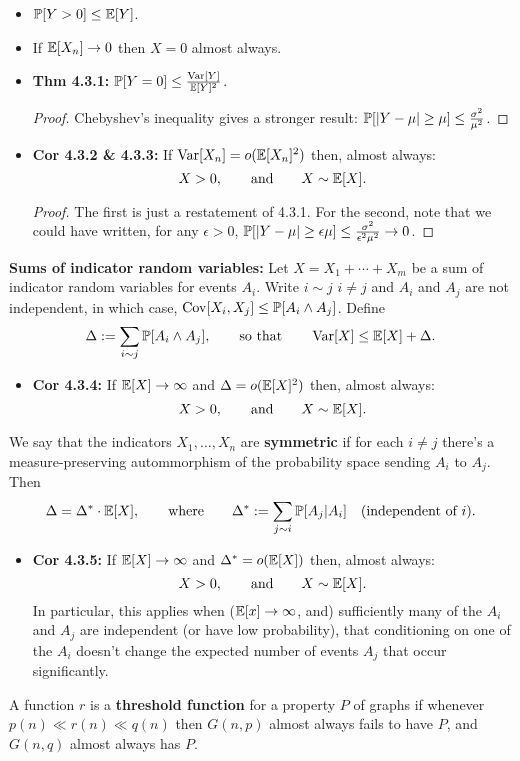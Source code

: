 \documentclass[11pt]{article}
\newenvironment{INT}[1][]{\begin{itemize}\small\item\textbf{#1}}{\end{itemize}}
\newcommand{\moreINT}[1][]{\item\textbf{#1}}
\begin{document}
\begin{chapter4}
\begin{itemise}
\begin{INT}
$\operatorname{\mathbb{P}}[Y>0]\leq\operatorname{\mathbb{E}}[Y]$.
\moreINT If $\operatorname{\mathbb{E}}[X_n]\rightarrow0$ then $X=0$ almost always.
\moreINT[Thm 4.3.1:] $\operatorname{\mathbb{P}}[Y=0]\leq\frac{\operatorname{Var}[Y]}{\operatorname{\mathbb{E}}[Y]^2}$.
\begin{proof}
Chebyshev's inequality gives a stronger result:
$\operatorname{\mathbb{P}}[|Y-\mu|\geq\mu]\leq\frac{\sigma^2}{\mu^2}$.
\end{proof}
\moreINT[Cor 4.3.2 \& 4.3.3:] If $\operatorname{Var}[X_n]=o(\operatorname{\mathbb{E}}[X_n]^2)$ then, almost always:
\[X>0,\textup{\qquad and\qquad}X\sim \operatorname{\mathbb{E}}[X].\]
\begin{proof}
The first is just a restatement of 4.3.1. For the second, note that we could have written, for any $\epsilon>0$, 
$\operatorname{\mathbb{P}}[|Y-\mu|\geq\epsilon\mu]\leq\frac{\sigma^2}{\epsilon^2\mu^2}\rightarrow0$.
\end{proof}
\end{INT}
\item \textbf{Sums of indicator random variables:} Let $X=X_1+\cdots+X_m$ be a sum of indicator random variables for events $A_i$. Write $i\sim j$ \Iff $i\neq j$ and $A_i$ and $A_j$ are not independent, in which case, $\operatorname{Cov}[X_i,X_j]\leq\operatorname{\mathbb{P}}[A_i\wedge A_j]$. Define
\[\Delta:=\sum_{i\sim j}\operatorname{\mathbb{P}}[A_i\wedge A_j],\textup{\qquad so that\qquad}\operatorname{Var}[X]\leq\operatorname{\mathbb{E}}[X]+\Delta.\]
\begin{INT}[Cor 4.3.4:]
If $\operatorname{\mathbb{E}}[X]\rightarrow\infty$ and $\Delta=o(\operatorname{\mathbb{E}}[X]^2)$ then, almost always:
\[X>0,\textup{\qquad and\qquad}X\sim \operatorname{\mathbb{E}}[X].\]
\end{INT}
We say that the indicators $X_1,\ldots,X_n$ are \textbf{symmetric} if for each $i\neq j$ there's a measure-preserving autommorphism of the probability space sending $A_i$ to $A_j$. Then
\[\Delta=\Delta^*\cdot\operatorname{\mathbb{E}}[X],\textup{\qquad where\qquad}\Delta^*:=\sum_{j\sim i}\operatorname{\mathbb{P}}[A_j|A_i]\textup{\quad(independent of $i$)}.\]
\begin{INT}[Cor 4.3.5:]
If $\operatorname{\mathbb{E}}[X]\rightarrow\infty$ and $\Delta^*=o(\operatorname{\mathbb{E}}[X])$ then, almost always:
\[X>0,\textup{\qquad and\qquad}X\sim \operatorname{\mathbb{E}}[X].\]
In particular, this applies when ($\operatorname{\mathbb{E}}[x]\rightarrow\infty$, and) sufficiently many of the $A_i$ and $A_j$ are independent (or have low probability), that conditioning on one of the $A_i$ doesn't change the expected number of events $A_j$ that occur significantly.
\end{INT}
\item %
A function $r$ is a \textbf{threshold function} for a property $P$ of graphs if whenever $p(n)\ll r(n)\ll q(n)$ then $G(n,p)$ almost always fails to have $P$, and $G(n,q)$ almost always has $P$.


\end{itemise}
\end{chapter4}
\end{document}

